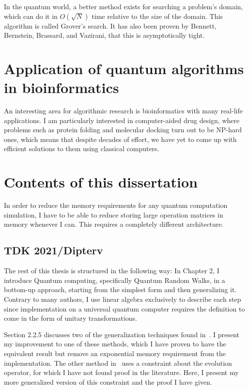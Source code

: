 In the quantum world, a better method exists for searching a problem's domain, which can do it in $O(\sqrt{N})$ time relative to the size of the domain. This algorithm is called Grover's search. It has also been proven by Bennett, Bernstein, Brassard, and Vazirani, that this is asymptotically tight\cite{bennett_strengths_1997}.

\section{Application of quantum algorithms in bioinformatics}

An interesting area for algorithmic research is bioinformatics with many real-life applications. I am particularly interested in computer-aided drug design, where problems such as protein folding\cite{crescenzi_complexity_1998} and molecular docking\cite{a_molecular_2018} turn out to be NP-hard ones, which means that despite decades of effort, we have yet to come up with efficient solutions to them using classical computers.


\section{Contents of this dissertation}

In order to reduce the memory requirements for any quantum computation simulation, I have to be able to reduce storing large operation matrices in memory whenever I can. This requires a completely different architecture.

\subsection{TDK 2021/Dipterv}

The rest of this thesis is structured in the following way: In Chapter 2, I introduce Quantum computing, specifically Quantum Random Walks, in a bottom-up approach, starting from the simplest form and then generalizing it. Contrary to many authors, I use linear algebra exclusively to describe each step since implementation on a universal quantum computer requires the definition to come in the form of unitary transformations.

Section 2.2.5 discusses two of the generalization techniques found in~\cite{Portugal}. I present my improvement to one of these methods, which I have proven to have the equivalent result but remove an exponential memory requirement from the implementation. The other method in~\cite{Portugal} uses a constraint about the evolution operator, for which I have not found proof in the literature. Here, I present my more generalized version of this constraint and the proof I have given.

